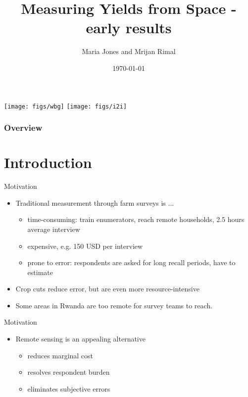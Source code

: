 \documentclass{beamer}
\title{Measuring Yields from Space - early results}
\author{Maria Jones and Mrijan Rimal}
\institute[World Bank]
{
	\medskip
	\textit{joint with F. Kondylis, J. Loeser, and J. Magruder}
}
\date{\today}
\begin{document}
	
\begin{frame}
	\titlepage \vspace{-0.2cm}
	\begin{centering}
		\texttt{[image: figs/wbg]} \qquad
		\texttt{[image: figs/i2i]} 
	\end{centering}

\end{frame}
	
\begin{frame}
	\frametitle{Overview} 
	\tableofcontents 
\end{frame}
	


\section{Introduction}

\begin{frame}{Motivation}
	\begin{itemize}
		\item Traditional measurement through farm surveys is ...
			\begin{itemize}
				\item	time-consuming: train enumerators, reach remote households, 2.5 hours average interview
				\item 	expensive, e.g. 150 USD per interview
				\item 	prone to error: respondents are asked for long recall periods, have to estimate
			\end{itemize}
		\item Crop cuts reduce error, but are even more resource-intensive
		\item Some areas in Rwanda are too remote for survey teams to reach.
	\end{itemize}
\end{frame}
	
\begin{frame}{Motivation}
	\begin{itemize}
		\item Remote sensing is an appealing alternative
			\begin{itemize}
				\item 	reduces marginal cost
				\item 	resolves respondent burden
				\item 	eliminates subjective errors
			\end{itemize}
	\end{itemize}
\end{frame}
\end{document}
